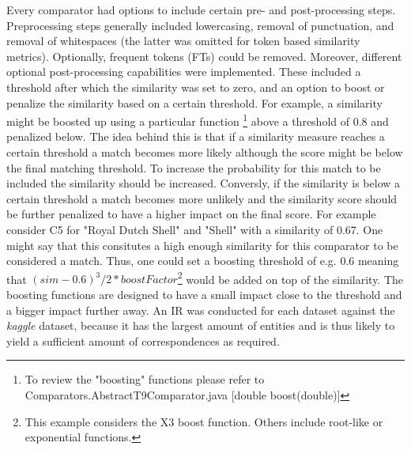 \documentclass[11pt,titlepage,oneside,openany]{article}
\begin{document}
 Every comparator had options to include certain pre- and post-processing steps. Preprocessing steps generally included lowercasing, removal of punctuation, and removal of whitespaces (the latter was omitted for token based similarity metrics). Optionally, frequent tokens (FTs) could be removed. Moreover, different optional post-processing capabilities were implemented. These included a threshold after which the similarity was set to zero, and an option to boost or penalize the similarity based on a certain threshold. For example, a similarity might be boosted up using a particular function%
\footnote{To review the "boosting" functions please refer to Comparators.AbstractT9Comparator.java [double boost(double)]}%
 above a threshold of 0.8 and penalized below. The idea behind this is that if a similarity measure reaches a certain threshold a match becomes more likely although the score might be below the final matching threshold. To increase the probability for this match to be included the similarity should be increased. Conversly, if the similarity is below a certain threshold a match becomes more unlikely and the similarity score should be further penalized to have a higher impact on the final score. For example consider C5 for "Royal Dutch Shell" and "Shell" with a similarity of 0.67. One might say that this consitutes a high enough similarity for this comparator to be considered a match. Thus, one could set a boosting threshold of e.g. 0.6 meaning that $(sim - 0.6)^3/2*boostFactor$\footnote{This example considers the X3 boost function. Others include root-like or exponential functions.} would be added on top of the similarity. The boosting functions are designed to have a small impact close to the threshold and a bigger impact further away. 
An IR was conducted for each dataset against the \textit{kaggle} dataset, because it has the largest amount of entities and is thus likely to yield a sufficient amount of correspondences as required.
\end{document}
